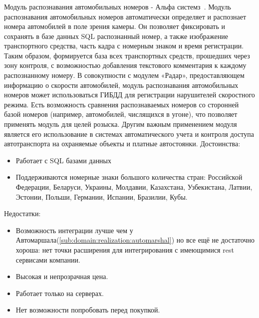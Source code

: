 \subsubsection{}
\label{sub:domain:}
Модуль распознавания автомобильных номеров - Альфа системз~\cite{alpha_system}. Модуль распознавания автомобильных номеров автоматически определяет и распознает номера автомобилей в поле зрения камеры. Он позволяет фиксировать и сохранять в базе данных SQL распознанный номер, а также изображение транспортного средства, часть кадра с номерным знаком и время регистрации. Таким образом, формируется база всех транспортных средств, прошедших через зону контроля, с возможностью добавления текстового комментария к каждому распознанному номеру. В совокупности с модулем «Радар», предоставляющем информацию о скорости автомобилей, модуль распознавания автомобильных номеров может использоваться ГИБДД для регистрации нарушителей скоростного режима. Есть возможность сравнения распознаваемых номеров со сторонней базой номеров (например, автомобилей, числящихся в угоне), что позволяет применять модуль для целей розыска. Другим важным применением модуля является его использование в системах автоматического учета и контроля доступа автотранспорта на охраняемые объекты и платные автостоянки.
Достоинства:
\begin{itemize}
  \item Работает с SQL базами данных
  \item Поддерживаются номерные знаки большого количества стран: Российской Федерации, Беларуси, Украины, Молдавии, Казахстана, Узбекистана, Латвии, Эстонии, Польши, Германии, Испании, Бразилии, Кубы.
\end{itemize}
Недостатки:
\begin{itemize}
  \item Возможность интеграции лучше чем у Автомаршала(\ref{sub:domain:realization:automarshal}) но все ещё не достаточно хороша: нет точки расширения для интегрирования с имеющимися rest сервисами компании.
  \item Высокая и непрозрачная цена.
  \item Работает только на \windows{} серверах.
  \item Нет возможности попробовать перед покупкой.
\end{itemize}

